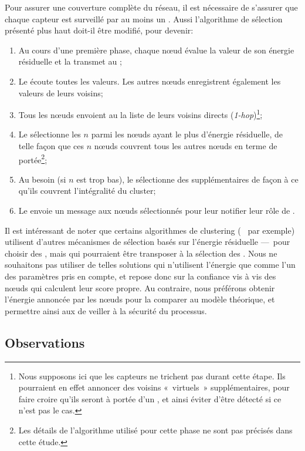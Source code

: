 Pour assurer une couverture complète du réseau, il est nécessaire de s'assurer que chaque capteur est surveillé par au moins un \cn.
Aussi l'algorithme de sélection présenté plus haut doit-il être modifié, pour devenir:
\begin{enumerate}
    \item Au cours d'une première phase, chaque nœud évalue la valeur de son énergie résiduelle et la transmet au \ch;
    \item Le \ch écoute toutes les valeurs. Les autres nœuds enregistrent également les valeurs de leurs voisins;
    \item Tous les nœuds envoient au \CH la liste de leurs voisins directs (\textit{1-hop})\footnote{Nous supposons ici que les capteurs ne trichent pas durant cette étape. Ils pourraient en effet annoncer des voisins « virtuels » supplémentaires, pour faire croire qu'ils seront à portée d'un \cn, et ainsi éviter d'être détecté si ce n'est pas le cas.};
    \item Le \CH sélectionne les $n$ \cns parmi les nœuds ayant le plus d'énergie résiduelle, de telle façon que ces $n$ nœuds couvrent tous les autres nœuds en terme de portée\footnote{Les détails de l'algorithme utilisé pour cette phase ne sont pas précisés dans cette étude.};
    \item Au besoin (si $n$ est trop bas), le \CH sélectionne des \cns supplémentaires de façon à ce qu'ils couvrent l'intégralité du cluster;
    \item Le \CH envoie un message aux nœuds sélectionnés pour leur notifier leur rôle de \cn.
\end{enumerate}

Il est intéressant de noter que certains algorithmes de clustering (\heed~\cite{YF04} par exemple) utilisent d'autres mécanismes de sélection basés sur l'énergie résiduelle ---~pour choisir des \chs, mais qui pourraient être transposer à la sélection des \cns.
Nous ne souhaitons pas utiliser de telles solutions qui n'utilisent l'énergie que comme l'un des paramètres pris en compte, et repose donc sur la confiance vis à vis des nœuds qui calculent leur score propre.
Au contraire, nous préférons obtenir l'énergie annoncée par les nœuds pour la comparer au modèle théorique, et permettre ainsi aux \vns de veiller à la sécurité du processus.

    \subsection{Observations}

